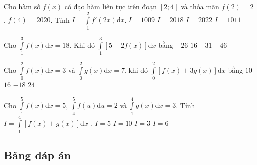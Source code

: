 \begin{ex}%
Cho hàm số $f(x)$ có đạo hàm liên tục trên đoạn $[2;4]$ và thỏa mãn $f(2)=2$, $f(4)=2020$. Tính $I=\displaystyle\int\limits_1^2f'(2x)\mathrm{d}x$.
\choice
{\True $I=1009$}
{$I=2018$}
{$I=2022$}
{$I=1011$}
\end{ex}

\begin{ex}%
Cho $\displaystyle\int\limits_1^3f(x)\mathrm{d}x=18$. Khi đó $\displaystyle\int\limits_1^3\left[5-2f(x)\right]\mathrm{d}x$ bằng
\choice
{\True $-26$}
{$16$}
{$-31$}
{$-46$}
\end{ex}

\begin{ex}%
Cho $\displaystyle\int\limits_0^2 f(x)\mathrm{d}x=3$ và $\displaystyle\int\limits_0^2 g(x)\mathrm{d}x=7$, khi đó $\displaystyle\int\limits_0^2 \left[f(x)+3g(x)\right] \mathrm{d}x$ bằng
\choice
{$10$}
{$16$}
{$-18$}
{\True $24$}
\end{ex}

\begin{ex}%
Cho $\displaystyle\int\limits_1^5f(x)\mathrm{d}x=5$, $\displaystyle\int\limits_4^5f(u)\mathrm{d}u=2$ và $\displaystyle\int\limits_1^4g(x)\mathrm{d}x=3$. Tính $I=\displaystyle\int\limits_1^4\left[f(x)+g(x)\right]\mathrm{d}x$ .
\choice
{$I=5$}
{$I=10$}
{$I=3$}
{\True $I=6$}
\end{ex}
\subsection{Bảng đáp án}

